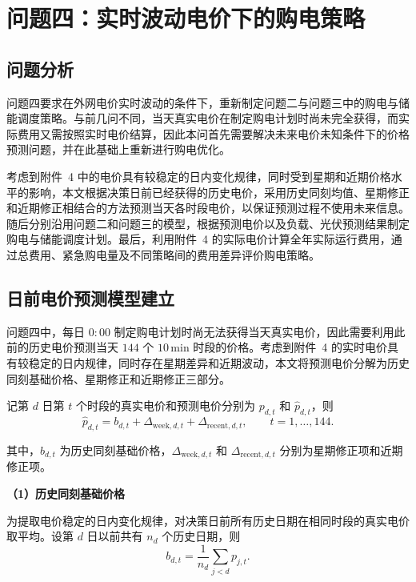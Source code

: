 \section{问题四：实时波动电价下的购电策略}

\subsection{问题分析}

问题四要求在外网电价实时波动的条件下，重新制定问题二与问题三中的购电与储能调度策略。与前几问不同，当天真实电价在制定购电计划时尚未完全获得，而实际费用又需按照实时电价结算，因此本问首先需要解决未来电价未知条件下的价格预测问题，并在此基础上重新进行购电优化。

考虑到附件~4 中的电价具有较稳定的日内变化规律，同时受到星期和近期价格水平的影响，本文根据决策日前已经获得的历史电价，采用历史同刻均值、星期修正和近期修正相结合的方法预测当天各时段电价，以保证预测过程不使用未来信息。随后分别沿用问题二和问题三的模型，根据预测电价以及负载、光伏预测结果制定购电与储能调度计划。最后，利用附件~4 的实际电价计算全年实际运行费用，通过总费用、紧急购电量及不同策略间的费用差异评价购电策略。

\subsection{日前电价预测模型建立}

问题四中，每日 $0{:}00$ 制定购电计划时尚无法获得当天真实电价，因此需要利用此前的历史电价预测当天 $144$ 个 $10\,\mathrm{min}$ 时段的价格。考虑到附件~4 的实时电价具有较稳定的日内规律，同时存在星期差异和近期波动，本文将预测电价分解为历史同刻基础价格、星期修正和近期修正三部分。

记第 $d$ 日第 $t$ 个时段的真实电价和预测电价分别为 $p_{d,t}$ 和 $\hat p_{d,t}$，则
\begin{equation}
\hat p_{d,t}
=
b_{d,t}
+
\Delta_{\mathrm{week},d,t}
+
\Delta_{\mathrm{recent},d,t},
\qquad t=1,\ldots,144.
\label{eq:q4_price_forecast}
\end{equation}

其中，$b_{d,t}$ 为历史同刻基础价格，$\Delta_{\mathrm{week},d,t}$ 和 $\Delta_{\mathrm{recent},d,t}$ 分别为星期修正项和近期修正项。

\textbf{（1）历史同刻基础价格}

为提取电价稳定的日内变化规律，对决策日前所有历史日期在相同时段的真实电价取平均。设第 $d$ 日以前共有 $n_d$ 个历史日期，则
\begin{equation}
b_{d,t}
=
\frac{1}{n_d}
\sum_{j<d}p_{j,t}.
\label{eq:q4_price_base}
\end{equation}

